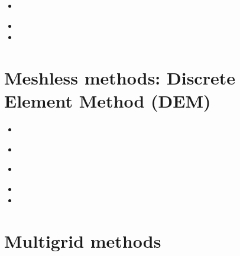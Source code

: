 \begin{scriptsize}
\begin{itemize}
\item[\twothousand]
\\
\item[\twothousandtwo]  
\item[\twothousandfour] 
\end{itemize}
\end{scriptsize}

\section{Meshless methods: Discrete Element Method (DEM)}

\begin{scriptsize}
\begin{itemize}
\item[\twothousandsix] 
\item[\twothousandthirteen]
\\
\item[\twothousandnineteen] 
\\
\item[\twothousandtwentytwo] 
\item[\twothousandtwentyfour] 
\end{itemize}
\end{scriptsize}




\section{Multigrid methods} 

